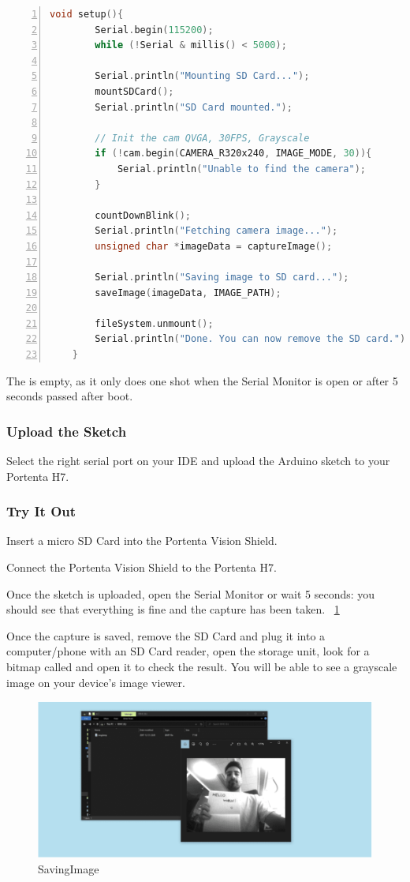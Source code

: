 \begin{lstlisting}[language=C++, frame=single, numbers=left, basicstyle=\ttfamily\small]
	void setup(){
		Serial.begin(115200);
		while (!Serial & millis() < 5000);
		
		Serial.println("Mounting SD Card...");
		mountSDCard();
		Serial.println("SD Card mounted.");
		
		// Init the cam QVGA, 30FPS, Grayscale
		if (!cam.begin(CAMERA_R320x240, IMAGE_MODE, 30)){
			Serial.println("Unable to find the camera");
		}
		
		countDownBlink();
		Serial.println("Fetching camera image...");
		unsigned char *imageData = captureImage();
		
		Serial.println("Saving image to SD card...");
		saveImage(imageData, IMAGE_PATH);
		
		fileSystem.unmount();
		Serial.println("Done. You can now remove the SD card.");
	}
\end{lstlisting}

The  is empty, as it only does one shot when the Serial Monitor is open or after 5 seconds passed after boot. \cite{portentaCameraToBitmap:2024}

\subsubsection{Upload the Sketch} Select the right serial port on your IDE and upload the Arduino sketch to your Portenta H7. \cite{portentaCameraToBitmap:2024}

\subsubsection{Try It Out} Insert a micro SD Card into the Portenta Vision Shield.

Connect the Portenta Vision Shield to the Portenta H7.

Once the sketch is uploaded, open the Serial Monitor or wait 5 seconds: you should see that everything is fine and the capture has been taken. ~\ref{SavingImage}

Once the capture is saved, remove the SD Card and plug it into a computer/phone with an SD Card reader, open the storage unit, look for a bitmap called  and open it to check the result. You will be able to see a grayscale image on your device's image viewer. \cite{portentaCameraToBitmap:2024}

\begin{figure}
	\begin{center}
		\includegraphics[width=0.7\linewidth]{Images/VisionShield/SavingImage.png}
		\caption{SavingImage}
		\label{SavingImage}
	\end{center}
\end{figure}

